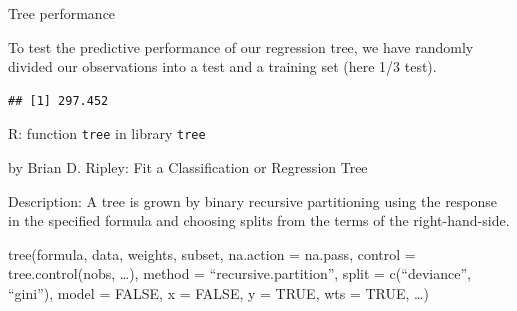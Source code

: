 \documentclass[ignorenonframetext,]{beamer}
\newenvironment{Shaded}{\begin{snugshade}}{\end{snugshade}}
\newcommand{\KeywordTok}[1]{\textcolor[rgb]{0.13,0.29,0.53}{\textbf{#1}}}
\newcommand{\DataTypeTok}[1]{\textcolor[rgb]{0.13,0.29,0.53}{#1}}
\newcommand{\DecValTok}[1]{\textcolor[rgb]{0.00,0.00,0.81}{#1}}
\newcommand{\StringTok}[1]{\textcolor[rgb]{0.31,0.60,0.02}{#1}}
\newcommand{\OperatorTok}[1]{\textcolor[rgb]{0.81,0.36,0.00}{\textbf{#1}}}
\newcommand{\NormalTok}[1]{#1}
\begin{document}
\begin{frame}[fragile]

\begin{block}{Tree performance}

To test the predictive performance of our regression tree, we have
randomly divided our observations into a test and a training set (here
1/3 test).

\begin{Shaded}
\end{Shaded}

\begin{verbatim}
## [1] 297.452
\end{verbatim}

\end{block}

\end{frame}

\begin{frame}[fragile]

\begin{block}{R: function \texttt{tree} in library \texttt{tree}}

by Brian D. Ripley: Fit a Classification or Regression Tree

Description: A tree is grown by binary recursive partitioning using the
response in the specified formula and choosing splits from the terms of
the right-hand-side.

tree(formula, data, weights, subset, na.action = na.pass, control =
tree.control(nobs, \ldots{}), method = ``recursive.partition'', split =
c(``deviance'', ``gini''), model = FALSE, x = FALSE, y = TRUE, wts =
TRUE, \ldots{})

\end{block}

\end{frame}
\end{document}
